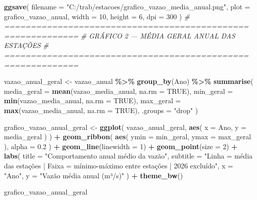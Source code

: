 \documentclass[
]{article}
\newenvironment{Shaded}{\begin{snugshade}}{\end{snugshade}}
\newcommand{\AttributeTok}[1]{\textcolor[rgb]{0.13,0.29,0.53}{#1}}
\newcommand{\CommentTok}[1]{\textcolor[rgb]{0.56,0.35,0.01}{\textit{#1}}}
\newcommand{\ConstantTok}[1]{\textcolor[rgb]{0.56,0.35,0.01}{#1}}
\newcommand{\DecValTok}[1]{\textcolor[rgb]{0.00,0.00,0.81}{#1}}
\newcommand{\FloatTok}[1]{\textcolor[rgb]{0.00,0.00,0.81}{#1}}
\newcommand{\FunctionTok}[1]{\textcolor[rgb]{0.13,0.29,0.53}{\textbf{#1}}}
\newcommand{\NormalTok}[1]{#1}
\newcommand{\OtherTok}[1]{\textcolor[rgb]{0.56,0.35,0.01}{#1}}
\newcommand{\SpecialCharTok}[1]{\textcolor[rgb]{0.81,0.36,0.00}{\textbf{#1}}}
\newcommand{\StringTok}[1]{\textcolor[rgb]{0.31,0.60,0.02}{#1}}
\begin{document}
\begin{Shaded}
\begin{Highlighting}[]
\FunctionTok{ggsave}\NormalTok{(}
  \AttributeTok{filename =} \StringTok{"C:/trab/estacoes/grafico\_vazao\_media\_anual.png"}\NormalTok{,}
  \AttributeTok{plot =}\NormalTok{ grafico\_vazao\_anual,}
  \AttributeTok{width =} \DecValTok{10}\NormalTok{,}
  \AttributeTok{height =} \DecValTok{6}\NormalTok{,}
  \AttributeTok{dpi =} \DecValTok{300}
\NormalTok{)}
\CommentTok{\# ============================================================}
\CommentTok{\# GRÁFICO 2 — MÉDIA GERAL ANUAL DAS ESTAÇÕES}
\CommentTok{\# ============================================================}

\NormalTok{vazao\_anual\_geral }\OtherTok{\textless{}{-}}\NormalTok{ vazao\_anual }\SpecialCharTok{\%\textgreater{}\%}
  \FunctionTok{group\_by}\NormalTok{(Ano) }\SpecialCharTok{\%\textgreater{}\%}
  \FunctionTok{summarise}\NormalTok{(}
    \AttributeTok{media\_geral =} \FunctionTok{mean}\NormalTok{(vazao\_media\_anual, }\AttributeTok{na.rm =} \ConstantTok{TRUE}\NormalTok{),}
    \AttributeTok{min\_geral =} \FunctionTok{min}\NormalTok{(vazao\_media\_anual, }\AttributeTok{na.rm =} \ConstantTok{TRUE}\NormalTok{),}
    \AttributeTok{max\_geral =} \FunctionTok{max}\NormalTok{(vazao\_media\_anual, }\AttributeTok{na.rm =} \ConstantTok{TRUE}\NormalTok{),}
    \AttributeTok{.groups =} \StringTok{"drop"}
\NormalTok{  )}

\NormalTok{grafico\_vazao\_anual\_geral }\OtherTok{\textless{}{-}} \FunctionTok{ggplot}\NormalTok{(}
\NormalTok{  vazao\_anual\_geral,}
  \FunctionTok{aes}\NormalTok{(}
    \AttributeTok{x =}\NormalTok{ Ano,}
    \AttributeTok{y =}\NormalTok{ media\_geral}
\NormalTok{  )}
\NormalTok{) }\SpecialCharTok{+}
  \FunctionTok{geom\_ribbon}\NormalTok{(}
    \FunctionTok{aes}\NormalTok{(}
      \AttributeTok{ymin =}\NormalTok{ min\_geral,}
      \AttributeTok{ymax =}\NormalTok{ max\_geral}
\NormalTok{    ),}
    \AttributeTok{alpha =} \FloatTok{0.2}
\NormalTok{  ) }\SpecialCharTok{+}
  \FunctionTok{geom\_line}\NormalTok{(}\AttributeTok{linewidth =} \DecValTok{1}\NormalTok{) }\SpecialCharTok{+}
  \FunctionTok{geom\_point}\NormalTok{(}\AttributeTok{size =} \DecValTok{2}\NormalTok{) }\SpecialCharTok{+}
  \FunctionTok{labs}\NormalTok{(}
    \AttributeTok{title =} \StringTok{"Comportamento anual médio da vazão"}\NormalTok{,}
    \AttributeTok{subtitle =} \StringTok{"Linha = média das estações | Faixa = mínimo{-}máximo entre estações | 2026 excluído"}\NormalTok{,}
    \AttributeTok{x =} \StringTok{"Ano"}\NormalTok{,}
    \AttributeTok{y =} \StringTok{"Vazão média anual (m³/s)"}
\NormalTok{  ) }\SpecialCharTok{+}
  \FunctionTok{theme\_bw}\NormalTok{()}

\NormalTok{grafico\_vazao\_anual\_geral}
\end{Highlighting}
\end{Shaded}
\end{document}
